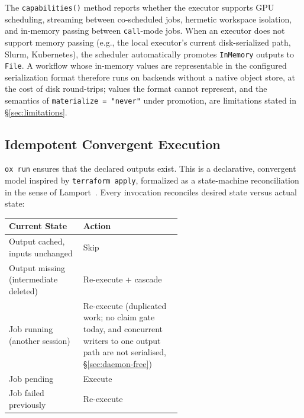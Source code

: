 \documentclass[12pt,a4paper]{article}
\newcommand{\code}[1]{{\texttt{\small\color{inlinecode}#1}}}
\begin{document}
The \code{capabilities()} method reports whether the executor supports GPU
scheduling, streaming between co-scheduled jobs, hermetic workspace
isolation, and in-memory passing between \code{call}-mode jobs. When
an executor does not support memory passing (e.g., the local executor's
current disk-serialized path, Slurm, Kubernetes), the scheduler
automatically promotes \code{InMemory} outputs to \code{File}. A
workflow whose in-memory values are representable in the configured
serialization format therefore runs on backends without a native
object store, at the cost of disk round-trips; values the format
cannot represent, and the semantics of
\code{materialize\,=\,"never"} under promotion, are limitations stated
in \S\ref{sec:limitations}.

\subsection{Idempotent Convergent Execution}
\label{sec:idempotent}

\code{ox run} ensures that the declared outputs exist.
This is a declarative, convergent model inspired by
\code{terraform apply}, formalized as a state-machine reconciliation in
the sense of Lamport~\cite{lamportSpecifyingSystems2002}. Every invocation
reconciles desired state versus actual state:

\begin{table}[htbp]
\centering\small
\begin{tabular}{@{}lp{0.58\linewidth}@{}}
\toprule
\textbf{Current State} & \textbf{Action} \\
\midrule
Output cached, inputs unchanged & Skip \\
Output missing (intermediate deleted) & Re-execute + cascade \\
Job running (another session) & Re-execute (duplicated work; no claim gate today,
  and concurrent writers to one output path are not serialised, \S\ref{sec:daemon-free}) \\
Job pending & Execute \\
Job failed previously & Re-execute \\
\bottomrule
\end{tabular}
\end{table}
\end{document}
